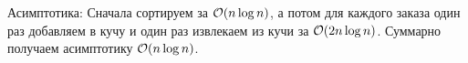 \begin{enumerate}
\begin{solution}
        Асимптотика:
        Сначала сортируем за $\mathcal{O}(n \log n)$, а потом для каждого заказа один раз добавляем в кучу и один раз извлекаем из кучи за $\mathcal{O}(2n \log n)$. Суммарно получаем асимптотику $\mathcal{O}(n \log n)$.
    \end{solution}











\end{enumerate}
    
